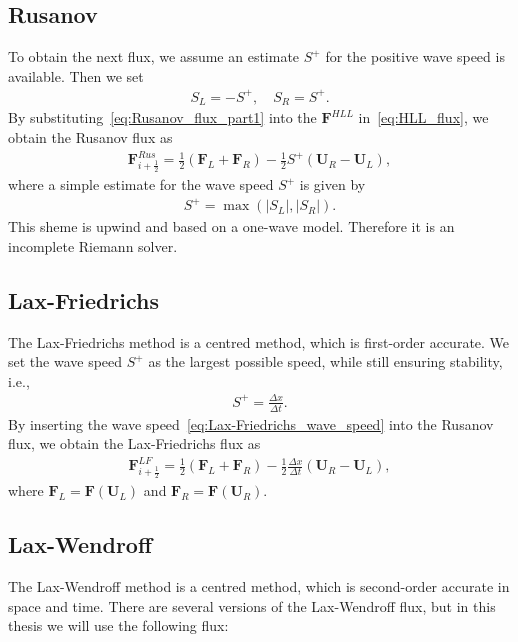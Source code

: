 \subsection{Rusanov}
To obtain the next flux, we assume an estimate $S^+$ for the positive wave speed is available.
Then we set 
\begin{align}\label{eq:Rusanov_flux_part1}
    S_L = -S^+, \quad S_R = S^+.
\end{align}
By substituting~\eqref{eq:Rusanov_flux_part1} into the $\mathbf{F}^{HLL}$ in~\eqref{eq:HLL_flux}, we obtain the Rusanov flux as
\begin{align}
    \mathbf{F}_{i+\frac{1}{2}}^{Rus} = \frac{1}{2} \left( \mathbf{F}_{L} + \mathbf{F}_{R}  \right)
    - \frac{1}{2} S^+ \left( \mathbf{U}_R - \mathbf{U}_L \right),
\end{align}
where a simple estimate for the wave speed $S^+$ is given by
\begin{align*}
    S^+ = \max ( |S_L|, |S_R|).
\end{align*}
This sheme is upwind and based on a one-wave model.
Therefore it is an incomplete Riemann solver.

\subsection{Lax-Friedrichs}
The Lax-Friedrichs method is a centred method, which is first-order accurate.
We set the wave speed $S^+$ as the largest possible speed, while still ensuring stability, i.e.,
\begin{align}\label{eq:Lax-Friedrichs_wave_speed}
    S^+ = \frac{\Delta x}{\Delta t}.
\end{align}
By inserting the wave speed~\eqref{eq:Lax-Friedrichs_wave_speed} into the Rusanov flux, we obtain the Lax-Friedrichs flux as
\begin{align*}
    \mathbf{F}_{i+\frac{1}{2}}^{LF} = \frac{1}{2} \left( {\mathbf{F}}_{L} + {\mathbf{F}}_{R} \right) - \frac{1}{2} \frac{\Delta x}{\Delta t} \left( \mathbf{U}_R - \mathbf{U}_L \right),
\end{align*}
where $\mathbf{F}_L = \mathbf{F}(\mathbf{U}_L)$ and $\mathbf{F}_R = \mathbf{F}(\mathbf{U}_R)$.

\subsection{Lax-Wendroff}
The Lax-Wendroff method is a centred method, which is second-order accurate in space and time.
There are several versions of the Lax-Wendroff flux, but in this thesis we will use the following flux:

